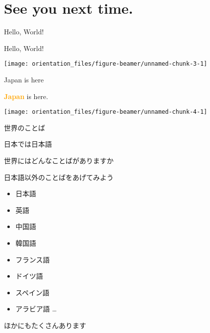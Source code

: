\documentclass[
  ignorenonframetext,
  aspectratio=169,
  xcolor=dvipsnames]{beamer}
\providecommand{\tightlist}{%
  \setlength{\itemsep}{0pt}\setlength{\parskip}{0pt}}
\begin{document}
\section{See you next time.}\label{see-you-next-time.}

\begin{frame}{}
\label{section-3}
\end{frame}

\begin{frame}{Hello, World!}
\label{hello-world}
\Large

Hello, World!

\texttt{[image: orientation\_files/figure-beamer/unnamed-chunk-3-1]}
\end{frame}

\begin{frame}{Japan is here}
\label{japan-is-here}
\Large

\textcolor{orange}{\bfseries Japan} is here.

\texttt{[image: orientation\_files/figure-beamer/unnamed-chunk-4-1]}
\end{frame}

\begin{frame}{世界のことば}
\label{ux4e16ux754cux306eux3053ux3068ux3070}
\Large

日本では日本語

\pause

世界にはどんなことばがありますか
\end{frame}

\begin{frame}{日本語以外のことばをあげてみよう}
\label{ux65e5ux672cux8a9eux4ee5ux5916ux306eux3053ux3068ux3070ux3092ux3042ux3052ux3066ux307fux3088ux3046}
\Large

\begin{itemize}[<+->]
\tightlist
\item
  日本語
\item
  英語
\item
  中国語
\item
  韓国語
\item
  フランス語
\item
  ドイツ語
\item
  スペイン語
\item
  アラビア語 \ldots
\end{itemize}

\pause

ほかにもたくさんあります
\end{frame}
\end{document}
